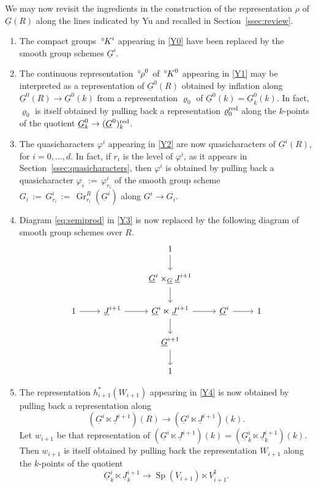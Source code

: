 \documentclass[10pt]{amsart}
\makeatletter
\theoremstyle{plain}
\theoremstyle{definition}
\newcommand{\Fq}{k}
\DeclareMathOperator{\Gr}{Gr}
\newcommand{\ceq}{{\, :=\, }}
\newcommand{\labitem}[2]{
\def\@itemlabel{\textbf{#1}}
\item
\def\@currentlabel{#1}\label{#2}}
\newcommand{\Sp}{{\operatorname{Sp}}}
\newcommand{\oK}{{\,^\circ \hskip-1pt K}}
\newcommand{\orho}{{\,^\circ \hskip-1pt \rho}}
\makeatother
\begin{document}
We may now revisit the ingredients in the construction of the representation $\rho$ of $\underline{G}(R)$ along the lines indicated by Yu and recalled in Section~\ref{ssec:review}.
\begin{enumerate}
\labitem{M0}{M0}
The compact groups $\oK^i$ appearing in \ref{Y0} have been replaced by the smooth group schemes $\underline{G}^i$.
\labitem{M1}{M1}
The continuous representation $\orho^0$ of $\oK^0$ appearing in \ref{Y1} may be interpreted as a representation of $\underline{G}^0(R)$ obtained by inflation along $\underline{G}^0(R) \to \underline{G}^0(\Fq)$ from a representation $\varrho_0$ of $\underline{G}^0(\Fq) = \underline{G}^0_\Fq(\Fq)$.
In fact, $\varrho_0$ is itself obtained by pulling back a representation $\varrho_0^{\operatorname{red}}$  along the $\Fq$-points of the quotient $\underline{G}^0_\Fq \to (\underline{G}^0)_\Fq^\reductive$.
\labitem{M2}{M2} The quasicharacters $\varphi^i$ appearing in \ref{Y2} are now quasicharacters of $\underline{G}^i(R)$, for $i=0, \ldots, d$.
In fact, if $r_i$ is the level of $\varphi^i$, as it appears in Section~\ref{ssec:quasicharacters}, then $\varphi^i$ is obtained by pulling back a quasicharacter $\varphi_i\ceq \varphi^i_{r_i}$ of the smooth group scheme $G_i\ceq G^i_{r_i} \ceq \Gr_{r_i}^{R}(\underline{G}^i)$ along $G^i \to G_i$.
\labitem{M3}{M3}
Diagram \eqref{eq:semiprod} in \ref{Y3} is now replaced by the following diagram of smooth group schemes over $R$.
\begin{equation}\label{eq:pimodel}
\begin{tikzcd}
\ && 1 \arrow{d} && \\
\ && \underline{G}^{i}\times_{\underline{G}} \underline{J}^{i+1}\arrow{d} && \\
1 \arrow{r} & \underline{J}^{i+1} \arrow{r} & \underline{G}^i \ltimes \underline{J}^{i+1} \arrow{d} \arrow{r} & \underline{G}^i \arrow{r} & 1\\
&& \underline{G}^{i+1} \arrow{d} && \\
&& 1 &&
\end{tikzcd}
\end{equation}
\labitem{M4}{M4}
The representation $h_{i+1}^*(W_{i+1})$ appearing in \ref{Y4} is now obtained by pulling back a representation along 
\[
(\underline{G}^i \ltimes \underline{J}^{i+1})(R) \to (\underline{G}^i \ltimes \underline{J}^{i+1})(\Fq).
\]
Let $w_{i+1}$ be that representation of $(\underline{G}^i \ltimes \underline{J}^{i+1})(\Fq) = (\underline{G}_\Fq^i \ltimes \underline{J}^{i+1}_\Fq)(\Fq)$. 
Then $w_{i+1}$ is itself obtained by pulling back the representation $W_{i+1}$ along the $\Fq$-points of the quotient
\[
\underline{G}_\Fq^i \ltimes \underline{J}^{i+1}_\Fq \to 
\Sp(V_{i+1}) \ltimes V_{i+1}^\sharp.
\]
\end{enumerate}
\end{document}
